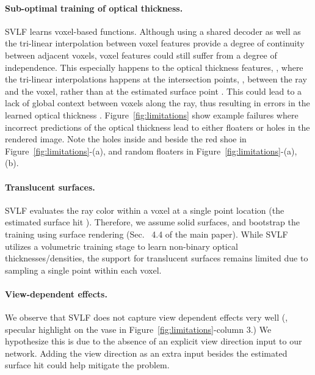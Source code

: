 \paragraph{Sub-optimal training of optical thickness.}
SVLF learns voxel-based functions.
Although using a shared decoder as well as the tri-linear interpolation between voxel features provide a degree of continuity between adjacent voxels,
voxel features could still suffer from a degree of independence.
This especially happens to the optical thickness features, , where the tri-linear interpolations happens at the intersection points, , between the ray and the voxel, rather than at the estimated surface point .
This could lead to a lack of global context between voxels along the ray, thus resulting in errors in the learned optical thickness .
Figure~\ref{fig:limitations} show example failures where incorrect predictions of the optical thickness  lead to either floaters or holes in the rendered image.
Note the holes inside and beside the red shoe in Figure~\ref{fig:limitations}-(a),
and random floaters in Figure~\ref{fig:limitations}-(a), (b).

\paragraph{Translucent surfaces.}
SVLF evaluates the ray color within a voxel at a single point location (the estimated surface hit ).
Therefore, we assume solid surfaces, and bootstrap the training using surface rendering (Sec.~{\color{red} 4.4} of the main paper).
While SVLF utilizes a volumetric training stage to learn non-binary optical thicknesses/densities, the support for translucent surfaces remains limited 
due to sampling a single point within each voxel.

\paragraph{View-dependent effects.}
We observe that SVLF does not capture view dependent effects very well (\eg, specular highlight on the vase in Figure~\ref{fig:limitations}-column 3.)
We hypothesize this is due to the absence of an explicit view direction input to our network.
Adding the view direction as an extra input besides the estimated surface hit  could help mitigate the problem. 



